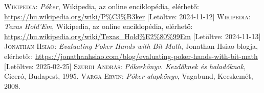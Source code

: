 \documentclass[]{thesis-ekf}
\theoremstyle{definition}
\theoremstyle{remark}
\begin{document}
\begin{thebibliography}{2}
	\textsc{Wikipedia}: \emph{Póker}, Wikipedia, az online enciklopédia, elérhető: \url{https://hu.wikipedia.org/wiki/P%C3%B3ker} [Letöltve: 2024-11-12]
	\textsc{Wikipedia}: \emph{Texas Hold'Em}, Wikipedia, az online enciklopédia, elérhető: \url{https://hu.wikipedia.org/wiki/Texas_Hold%E2%80%99Em} [Letöltve: 2024-11-13]
	\textsc{Jonathan Hsiao}: \emph{Evaluating Poker Hands with Bit Math}, Jonathan Hsiao blogja, elérhető:: \url{https://jonathanhsiao.com/blog/evaluating-poker-hands-with-bit-math} [Letöltve: 2025-02-25]
	\textsc{Szurdi András}: \emph{Pókerkönyv. Kezdőknek és haladóknak}, Ciceró, Budapest, 1995.
	\textsc{Varga Ervin}: \emph{Póker alapkönyv}, Vagabund, Kecskemét, 2008.
\end{thebibliography}

%
\end{document}
